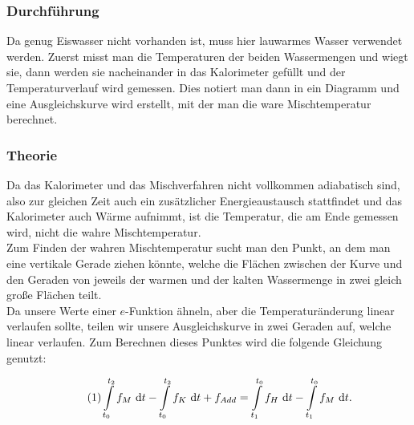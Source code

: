 \documentclass[11pt,a4paper]{article}
\begin{document}
\subsubsection{Durchf\"uhrung}

Da genug Eiswasser nicht vorhanden ist, muss hier lauwarmes Wasser verwendet werden. Zuerst misst man die Temperaturen der beiden Wassermengen und wiegt sie, dann werden sie nacheinander in das Kalorimeter gef\"ullt und der Temperaturverlauf wird gemessen. Dies notiert man dann in ein Diagramm und eine Ausgleichskurve wird erstellt, mit der man die ware Mischtemperatur berechnet.

\subsubsection{Theorie}

Da das Kalorimeter und das Mischverfahren nicht vollkommen adiabatisch sind, also zur gleichen Zeit auch ein zus\"atzlicher Energieaustausch stattfindet und das Kalorimeter auch W\"arme aufnimmt, ist die Temperatur, die am Ende gemessen wird, nicht die wahre Mischtemperatur.\\
Zum Finden der wahren Mischtemperatur sucht man den Punkt, an dem man eine vertikale Gerade ziehen k\"onnte, welche die Fl\"achen zwischen der Kurve und den Geraden von jeweils der warmen und der kalten Wassermenge in zwei gleich gro\ss e Fl\"achen teilt.\\
Da unsere Werte einer $e$-Funktion \"ahneln, aber die Temperatur\"anderung linear verlaufen sollte, teilen wir unsere Ausgleichskurve in zwei Geraden auf, welche linear verlaufen.
Zum Berechnen dieses Punktes wird die folgende Gleichung genutzt:

\begin{equation}\tag{1}
\int\displaylimits_{t_{0}}^{t_2} f_M\ \mathrm{d}t - \int\displaylimits_{t_{0}}^{t_2} f_K\ \mathrm{d}t + f_{Add}= \int\displaylimits_{t_1}^{t_{0}} f_H\ \mathrm{d}t - \int\displaylimits_{t_1}^{t_{0}} f_M\ \mathrm{d}t.\label{bigint1}
\end{equation}
\end{document}
